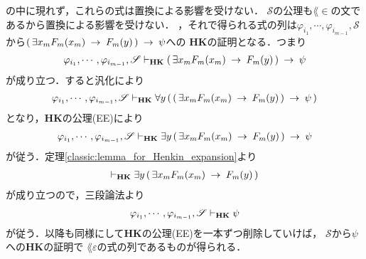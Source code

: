 \begin{sketch}
{			の中に現れず，これらの式は置換による影響を受けない．
			$\mathscr{S}$の公理も$\lang{\in}$の文であるから置換による影響を受けない．
		}，それで得られる式の列は$\varphi_{i_{1}},\cdots,\varphi_{i_{m-1}},\mathscr{S}$
		から$(\, \exists x_{m} F_{m}(x_{m}) \hspace{0.25em}\rightarrow\hspace{0.25em} F_{m}(y)\, ) \hspace{0.25em}\rightarrow\hspace{0.25em} \psi$への
		{\bf HK}の証明となる．つまり
		\begin{align}
			\varphi_{i_{1}},\cdots,\varphi_{i_{m-1}},\mathscr{S} 
			\vdash_{{\scriptsize \mbox{{\bf HK}}}} 
			(\, \exists x_{m} F_{m}(x_{m}) \hspace{0.25em}\rightarrow\hspace{0.25em} F_{m}(y)\, ) \hspace{0.25em}\rightarrow\hspace{0.25em} \psi
		\end{align}
		が成り立つ．すると汎化により
		\begin{align}
			\varphi_{i_{1}},\cdots,\varphi_{i_{m-1}},\mathscr{S} 
			\vdash_{{\scriptsize \mbox{{\bf HK}}}} 
			\forall y\, (\, (\, \exists x_{m} F_{m}(x_{m}) \hspace{0.25em}\rightarrow\hspace{0.25em} F_{m}(y)\, ) \hspace{0.25em}\rightarrow\hspace{0.25em} \psi\, )
		\end{align}
		となり，{\bf HK}の公理(EE)により
		\begin{align}
			\varphi_{i_{1}},\cdots,\varphi_{i_{m-1}},\mathscr{S} 
			\vdash_{{\scriptsize \mbox{{\bf HK}}}} 
			\exists y\, (\, \exists x_{m} F_{m}(x_{m}) \hspace{0.25em}\rightarrow\hspace{0.25em} F_{m}(y)\, ) \hspace{0.25em}\rightarrow\hspace{0.25em} \psi
		\end{align}
		が従う．定理\ref{classic:lemma_for_Henkin_expansion}より
		\begin{align}
			\vdash_{{\scriptsize \mbox{{\bf HK}}}} 
			\exists y\, (\, \exists x_{m} F_{m}(x_{m}) \hspace{0.25em}\rightarrow\hspace{0.25em} F_{m}(y)\, )
		\end{align}
		が成り立つので，三段論法より
		\begin{align}
			\varphi_{i_{1}},\cdots,\varphi_{i_{m-1}},\mathscr{S} 
			\vdash_{{\scriptsize \mbox{{\bf HK}}}} \psi
		\end{align}
		が従う．以降も同様にして{\bf HK}の公理(EE)を一本ずつ削除していけば，
		$\mathscr{S}$から$\psi$への{\bf HK}の証明で
		$\lang{\varepsilon}$の式の列であるものが得られる．
		\QED
	\end{sketch}
	
